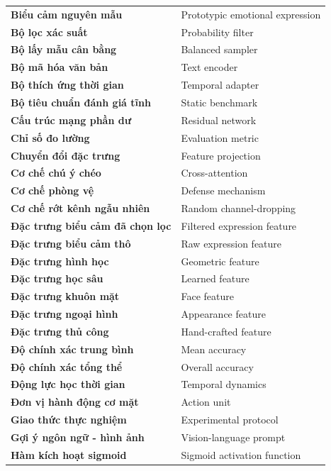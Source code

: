\begin{longtable}{p{6.5cm} p{8.5cm}}
\textbf{Biểu cảm nguyên mẫu} & Prototypic emotional expression \\
\textbf{Bộ lọc xác suất} & Probability filter \\
\textbf{Bộ lấy mẫu cân bằng} & Balanced sampler \\
\textbf{Bộ mã hóa văn bản} & Text encoder \\
\textbf{Bộ thích ứng thời gian} & Temporal adapter \\
\textbf{Bộ tiêu chuẩn đánh giá tĩnh} & Static benchmark \\
\textbf{Cấu trúc mạng phần dư} & Residual network \\
\textbf{Chỉ số đo lường} & Evaluation metric \\
\textbf{Chuyển đổi đặc trưng} & Feature projection \\
\textbf{Cơ chế chú ý chéo} & Cross-attention \\
\textbf{Cơ chế phòng vệ} & Defense mechanism \\
\textbf{Cơ chế rớt kênh ngẫu nhiên} & Random channel-dropping \\
\textbf{Đặc trưng biểu cảm đã chọn lọc} & Filtered expression feature \\
\textbf{Đặc trưng biểu cảm thô} & Raw expression feature \\
\textbf{Đặc trưng hình học} & Geometric feature \\
\textbf{Đặc trưng học sâu} & Learned feature \\
\textbf{Đặc trưng khuôn mặt} & Face feature \\
\textbf{Đặc trưng ngoại hình} & Appearance feature \\
\textbf{Đặc trưng thủ công} & Hand-crafted feature \\
\textbf{Độ chính xác trung bình} & Mean accuracy \\
\textbf{Độ chính xác tổng thể} & Overall accuracy \\
\textbf{Động lực học thời gian} & Temporal dynamics \\
\textbf{Đơn vị hành động cơ mặt} & Action unit \\
\textbf{Giao thức thực nghiệm} & Experimental protocol \\
\textbf{Gợi ý ngôn ngữ - hình ảnh} & Vision-language prompt \\
\textbf{Hàm kích hoạt sigmoid} & Sigmoid activation function \\

\end{longtable}
